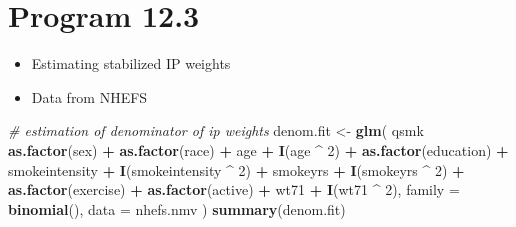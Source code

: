 \documentclass[10pt,]{book}
\newenvironment{Shaded}{\begin{snugshade}}{\end{snugshade}}
\newcommand{\CommentTok}[1]{\textcolor[rgb]{0.56,0.35,0.01}{\textit{#1}}}
\newcommand{\DataTypeTok}[1]{\textcolor[rgb]{0.13,0.29,0.53}{#1}}
\newcommand{\DecValTok}[1]{\textcolor[rgb]{0.00,0.00,0.81}{#1}}
\newcommand{\KeywordTok}[1]{\textcolor[rgb]{0.13,0.29,0.53}{\textbf{#1}}}
\newcommand{\NormalTok}[1]{#1}
\newcommand{\OperatorTok}[1]{\textcolor[rgb]{0.81,0.36,0.00}{\textbf{#1}}}
\newcommand{\StringTok}[1]{\textcolor[rgb]{0.31,0.60,0.02}{#1}}
\providecommand{\tightlist}{%
  \setlength{\itemsep}{0pt}\setlength{\parskip}{0pt}}
\begin{document}
\hypertarget{program-12.3}{%
\section{Program 12.3}\label{program-12.3}}

\begin{itemize}
\tightlist
\item
  Estimating stabilized IP weights
\item
  Data from NHEFS
\end{itemize}

\begin{Shaded}
\begin{Highlighting}[]
\CommentTok{# estimation of denominator of ip weights}
\NormalTok{denom.fit <-}
\StringTok{  }\KeywordTok{glm}\NormalTok{(}
\NormalTok{    qsmk }\OperatorTok{~}\StringTok{ }\KeywordTok{as.factor}\NormalTok{(sex) }\OperatorTok{+}\StringTok{ }\KeywordTok{as.factor}\NormalTok{(race) }\OperatorTok{+}\StringTok{ }\NormalTok{age }\OperatorTok{+}\StringTok{ }\KeywordTok{I}\NormalTok{(age }\OperatorTok{^}\StringTok{ }\DecValTok{2}\NormalTok{) }\OperatorTok{+}
\StringTok{      }\KeywordTok{as.factor}\NormalTok{(education) }\OperatorTok{+}\StringTok{ }\NormalTok{smokeintensity }\OperatorTok{+}
\StringTok{      }\KeywordTok{I}\NormalTok{(smokeintensity }\OperatorTok{^}\StringTok{ }\DecValTok{2}\NormalTok{) }\OperatorTok{+}\StringTok{ }\NormalTok{smokeyrs }\OperatorTok{+}\StringTok{ }\KeywordTok{I}\NormalTok{(smokeyrs }\OperatorTok{^}\StringTok{ }\DecValTok{2}\NormalTok{) }\OperatorTok{+}
\StringTok{      }\KeywordTok{as.factor}\NormalTok{(exercise) }\OperatorTok{+}\StringTok{ }\KeywordTok{as.factor}\NormalTok{(active) }\OperatorTok{+}\StringTok{ }\NormalTok{wt71 }\OperatorTok{+}\StringTok{ }\KeywordTok{I}\NormalTok{(wt71 }\OperatorTok{^}\StringTok{ }\DecValTok{2}\NormalTok{),}
    \DataTypeTok{family =} \KeywordTok{binomial}\NormalTok{(),}
    \DataTypeTok{data =}\NormalTok{ nhefs.nmv}
\NormalTok{  )}
\KeywordTok{summary}\NormalTok{(denom.fit)}
\end{Highlighting}
\end{Shaded}
\end{document}
